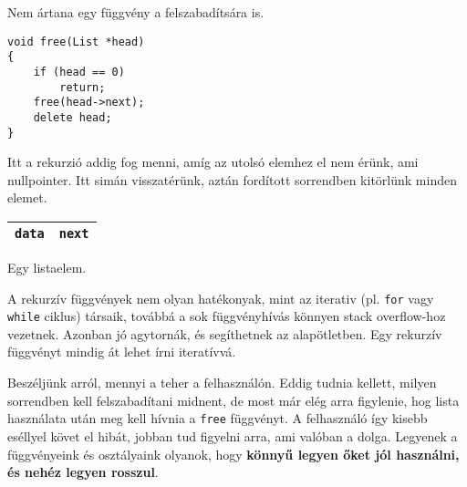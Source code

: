 \documentclass[a4paper,11.5pt]{article}
\begin{document}
	Nem ártana egy függvény a felszabadítsára is.
	\begin{lstlisting}
void free(List *head)
{
	if (head == 0)
		return;
	free(head->next);
	delete head;
}
	\end{lstlisting}
	Itt a rekurzió addig fog menni, amíg az utolsó elemhez el nem érünk, ami nullpointer. Itt simán visszatérünk, aztán fordított sorrendben kitörlünk minden elemet.
	\begin{center}
		\begin{tabular}{|c|c|}
			\hline
			\texttt{data}&\texttt{next}\\
			\hline
		\end{tabular}
		\smallskip
		
		Egy listaelem.
	\end{center}
	\begin{note}
		A rekurzív függvények nem olyan hatékonyak, mint az iterativ (pl. \texttt{for} vagy \texttt{while} ciklus) társaik, továbbá a sok függvényhívás könnyen stack overflow-hoz vezetnek. Azonban jó agytornák, és segíthetnek az alapötletben. Egy rekurzív függvényt mindig át lehet írni iteratívvá.
	\end{note}
	Beszéljünk arról, mennyi a teher a felhasználón. Eddig tudnia kellett, milyen sorrendben kell felszabadítani midnent, de most már elég arra figylenie, hog lista használata után meg kell hívnia a \texttt{free} függvényt. A felhasználó így kisebb eséllyel követ el hibát, jobban tud figyelni arra, ami valóban a dolga. Legyenek a függvényeink és osztályaink olyanok, hogy \textbf{könnyű legyen őket jól használni, és nehéz legyen rosszul}.
	
\end{document}
